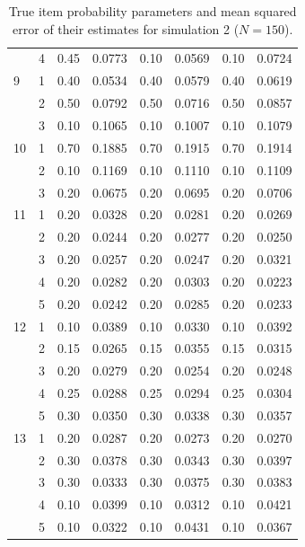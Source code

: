 \begin{table}[H]
\begin{tabular}{llcccccc}
   & 4 & 0.45 & 0.0773 & 0.10 & 0.0569 & 0.10 & 0.0724 \\ 
  9 & 1 & 0.40 & 0.0534 & 0.40 & 0.0579 & 0.40 & 0.0619 \\ 
   & 2 & 0.50 & 0.0792 & 0.50 & 0.0716 & 0.50 & 0.0857 \\ 
   & 3 & 0.10 & 0.1065 & 0.10 & 0.1007 & 0.10 & 0.1079 \\ 
  10 & 1 & 0.70 & 0.1885 & 0.70 & 0.1915 & 0.70 & 0.1914 \\ 
   & 2 & 0.10 & 0.1169 & 0.10 & 0.1110 & 0.10 & 0.1109 \\ 
   & 3 & 0.20 & 0.0675 & 0.20 & 0.0695 & 0.20 & 0.0706 \\ 
  11 & 1 & 0.20 & 0.0328 & 0.20 & 0.0281 & 0.20 & 0.0269 \\ 
   & 2 & 0.20 & 0.0244 & 0.20 & 0.0277 & 0.20 & 0.0250 \\ 
   & 3 & 0.20 & 0.0257 & 0.20 & 0.0247 & 0.20 & 0.0321 \\ 
   & 4 & 0.20 & 0.0282 & 0.20 & 0.0303 & 0.20 & 0.0223 \\ 
   & 5 & 0.20 & 0.0242 & 0.20 & 0.0285 & 0.20 & 0.0233 \\ 
  12 & 1 & 0.10 & 0.0389 & 0.10 & 0.0330 & 0.10 & 0.0392 \\ 
   & 2 & 0.15 & 0.0265 & 0.15 & 0.0355 & 0.15 & 0.0315 \\ 
   & 3 & 0.20 & 0.0279 & 0.20 & 0.0254 & 0.20 & 0.0248 \\ 
   & 4 & 0.25 & 0.0288 & 0.25 & 0.0294 & 0.25 & 0.0304 \\ 
   & 5 & 0.30 & 0.0350 & 0.30 & 0.0338 & 0.30 & 0.0357 \\ 
  13 & 1 & 0.20 & 0.0287 & 0.20 & 0.0273 & 0.20 & 0.0270 \\ 
   & 2 & 0.30 & 0.0378 & 0.30 & 0.0343 & 0.30 & 0.0397 \\ 
   & 3 & 0.30 & 0.0333 & 0.30 & 0.0375 & 0.30 & 0.0383 \\ 
   & 4 & 0.10 & 0.0399 & 0.10 & 0.0312 & 0.10 & 0.0421 \\ 
   & 5 & 0.10 & 0.0322 & 0.10 & 0.0431 & 0.10 & 0.0367 \\ 
   \bottomrule
\end{tabular}
\caption{True item probability parameters and mean squared error of their estimates for simulation 2 ($N = 150$).} 
\label{table:sim2_item_prob_mse_N150}
\end{table}
